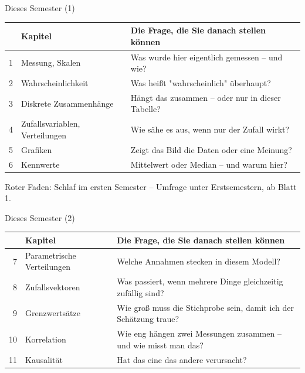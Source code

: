 \documentclass[
  10pt,
  ignorenonframetext,
]{beamer}
\begin{document}
\begin{frame}{Dieses Semester (1)}
\protect\hypertarget{dieses-semester-1}{}
\renewcommand{\arraystretch}{1.3}
\begin{tabular}{@{}r>{\raggedright\arraybackslash}p{3.9cm}>{\raggedright\arraybackslash}p{6.9cm}@{}}
\toprule
 & \textbf{Kapitel} & \textbf{Die Frage, die Sie danach stellen können} \\
\midrule
1 & Messung, Skalen & Was wurde hier eigentlich gemessen -- und wie? \\
2 & Wahrscheinlichkeit & Was heißt "wahrscheinlich" überhaupt? \\
3 & Diskrete Zusammenhänge & Hängt das zusammen -- oder nur in dieser Tabelle? \\
4 & Zufallsvariablen, Verteilungen & Wie sähe es aus, wenn nur der Zufall wirkt? \\
5 & Grafiken & Zeigt das Bild die Daten oder eine Meinung? \\
6 & Kennwerte & Mittelwert oder Median -- und warum hier? \\
\bottomrule
\end{tabular}

\vspace{1em}

Roter Faden: Schlaf im ersten Semester -- Umfrage unter Erstsemestern,
ab Blatt 1.
\end{frame}

\begin{frame}{Dieses Semester (2)}
\protect\hypertarget{dieses-semester-2}{}
\renewcommand{\arraystretch}{1.3}
\begin{tabular}{@{}r>{\raggedright\arraybackslash}p{3.9cm}>{\raggedright\arraybackslash}p{6.9cm}@{}}
\toprule
 & \textbf{Kapitel} & \textbf{Die Frage, die Sie danach stellen können} \\
\midrule
7 & Parametrische Verteilungen & Welche Annahmen stecken in diesem Modell? \\
8 & Zufallsvektoren & Was passiert, wenn mehrere Dinge gleichzeitig zufällig sind? \\
9 & Grenzwertsätze & Wie groß muss die Stichprobe sein, damit ich der Schätzung traue? \\
10 & Korrelation & Wie eng hängen zwei Messungen zusammen -- und wie misst man das? \\
11 & Kausalität & Hat das eine das andere verursacht? \\
\bottomrule
\end{tabular}
\end{frame}
\end{document}
